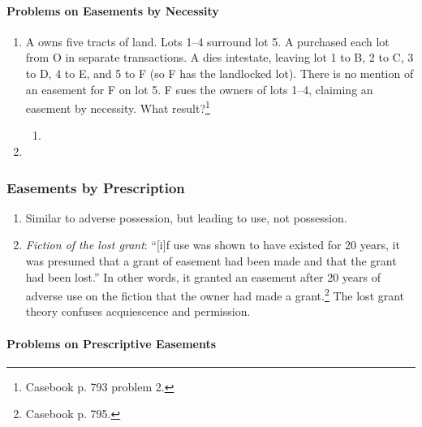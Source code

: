 \paragraph{Problems on Easements by Necessity}

\begin{enumerate}
    \item A owns five tracts of land. Lots 1--4 surround lot 5. A purchased 
    each lot from O in separate transactions. A dies intestate, leaving lot 1 
    to B, 2 to C, 3 to D, 4 to E, and 5 to F (so F has the landlocked lot). 
    There is no mention of an easement for F on lot 5. F sues the owners of 
    lots 1--4, claiming an easement by necessity. What 
    result?\footnote{Casebook p. 793 problem 2.}
    \begin{enumerate}
        \item %
    \end{enumerate}
    \item %
\end{enumerate}

\subsubsection{Easements by Prescription}

\begin{enumerate}
    \item Similar to adverse possession, but leading to use, not possession.
    \item \emph{Fiction of the lost grant}: ``[i]f use was shown to have 
    existed for 20 years, it was presumed that a grant of easement had been 
    made and that the grant had been lost.'' In other words, it granted an 
    easement after 20 years of adverse use on the fiction that the owner had 
    made a grant.\footnote{Casebook p. 795.} The lost grant theory confuses 
    acquiescence and permission.
\end{enumerate}

\paragraph{Problems on Prescriptive Easements}

